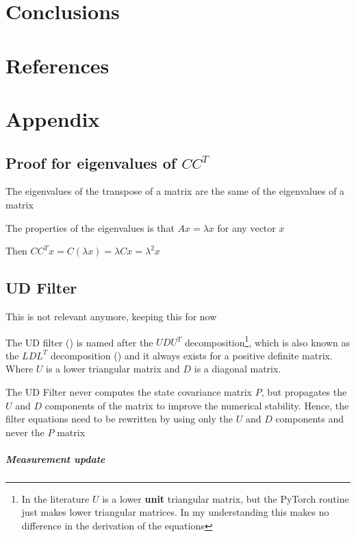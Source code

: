 \documentclass{article}
\let\Oldsection\section
\renewcommand{\section}{\FloatBarrier\Oldsection}
\let\Oldsubsection\subsection
\renewcommand{\subsection}{\FloatBarrier\Oldsubsection}
\begin{document}
\section{Conclusions}



\section*{References}

\printbibliography

\section*{Appendix}

\subsection{Proof for eigenvalues of $CC^T$}

The eigenvalues of the transpose of a matrix are the same of the eigenvalues of a matrix

The properties of the eigenvalues is that $Ax=\lambda x$ for any vector $x$

Then $CC^Tx=C(\lambda x) = \lambda Cx = \lambda^2 x$

\subsection{UD Filter}


This is not relevant anymore, keeping this for now

The UD filter (\cite{bierman_numerical_1977}) is named after the $UDU^T$ decomposition\footnote{In the literature $U$ is a lower \textbf{unit} triangular matrix, but the PyTorch routine just makes lower triangular matrices. In my understanding this makes no difference in the derivation of the equations}, which is also known as the $LDL^T$ decomposition (\cite{golub_matrix_2013}) and it always exists for a positive definite matrix. Where $U$ is a lower triangular matrix and $D$ is a diagonal matrix.

The UD Filter never computes the state covariance matrix $P$, but propagates the $U$ and $D$ components of the matrix to improve the numerical stability. Hence, the filter equations need to be rewritten by using only the $U$ and $D$ components and never the $P$ matrix

\subparagraph{Measurement update}
\end{document}
